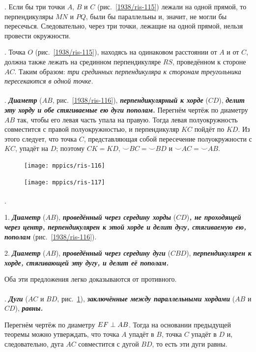 \documentclass[twoside]{book}
\begin{document}
\smallskip
{}.
Если бы три точки $A$, $B$ и $C$ (рис.~\ref{1938/ris-115}) лежали на одной прямой, то перпендикуляры $MN$ и $PQ$, были бы параллельны и, значит, не могли бы пересечься.
Следовательно, через три точки, лежащие на одной прямой, нельзя провести окружности.

\smallskip
{}.
Точка $O$ (рис.~\ref{1938/ris-115}), находясь на одинаковом расстоянии от $A$ и от $C$, должна также лежать на срединном перпендикуляре $RS$, проведённом к стороне $AC$. 
Таким образом:
\emph{три срединных перпендикуляра к сторонам треугольника пересекаются в одной точке.}

\paragraph{}\label{1938/105}
\mbox{.}
\textbf{\emph{Диаметр}} ($AB$, рис.~\ref{1938/ris-116}), \textbf{\emph{перпендикулярный к хорде}} ($CD$), \textbf{\emph{делит эту хорду и обе стягиваемые ею дуги пополам.}}
Перегнём чертёж по диаметру $AB$ так, чтобы его левая часть упала на правую.
Тогда левая полуокружность совместится с правой полуокружностью, и перпендикуляр $KC$ пойдёт по $KD$.
Из этого следует, что точка $C$, представляющая собой пересечение полуокружности с $KC$, упадёт на $D$;
поэтому $CK=KD$,
${\smallsmile} BC={\smallsmile} BD$ и
${\smallsmile} AC={\smallsmile} AB$.

{

\begin{figure}
\centering
\texttt{[image: mppics/ris-116]}
\caption{}\label{1938/ris-116}
\bigskip
\texttt{[image: mppics/ris-117]}
\caption{}\label{1938/ris-117}
\end{figure}

\paragraph{}\label{1938/106}
\mbox{.}

1.
\textbf{\emph{Диаметр}} ($AB$), \textbf{\emph{проведённый через середину хорды}} ($CD$)\textbf{\emph{, не проходящей через центр, перпендикулярен к этой хорде и делит дугу, стягиваемую ею, пополам}} (рис.~\ref{1938/ris-116}).


2.
\textbf{\emph{Диаметр}} ($AB$), \textbf{\emph{проведённый через середину дуги}} ($CBD$), \textbf{\emph{перпендикулярен к хорде, стягивающей эту дугу, и делит её пополам.}}

Оба эти предложения легко доказываются от противного.


\paragraph{}\label{1938/107}
\mbox{.}
\textbf{\emph{Дуги}} ($AC$ и $BD$, рис.~\ref{1938/ris-117}), \textbf{\emph{заключённые между параллельными хордами}} ($AB$ и $CD$), \textbf{\emph{равны.}}

Перегнём чертёж по диаметру $EF\z\perp AB$.
Тогда на основании предыдущей теоремы можно утверждать, что точка $A$ упадёт в $B$, точка $C$ упадёт в $D$ и, следовательно, дуга $AC$ совместится с дугой $BD$, то есть эти дуги равны.

}
\end{document}
